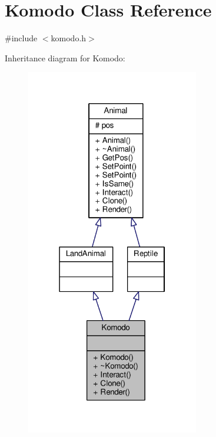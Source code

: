 \hypertarget{classKomodo}{}\section{Komodo Class Reference}
\label{classKomodo}


{\ttfamily \#include $<$komodo.\+h$>$}



Inheritance diagram for Komodo\+:
\nopagebreak
\begin{figure}[H]
\begin{center}
\leavevmode
\includegraphics[width=214pt]{classKomodo__inherit__graph}
\end{center}
\end{figure}


